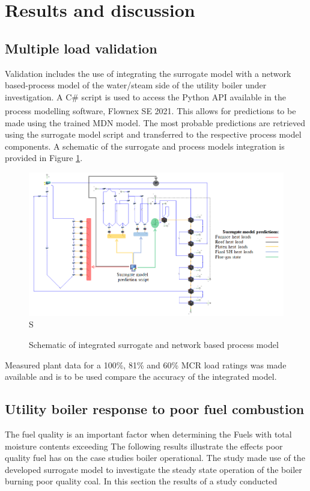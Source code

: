 \documentclass[a4paper,fleqn]{cas-sc}
\begin{document}
\section{Results and discussion}
\subsection{Multiple load validation}

Validation includes the use of integrating the surrogate model with a network based-process model of the water/steam side of the utility boiler under investigation. A C\# script is used to access the Python API available in the process modelling software, Flownex SE\textsuperscript{\textregistered} 2021. This allows for predictions to be made using the trained MDN model. The most probable predictions are retrieved using the surrogate model script and transferred to the respective process model components. A schematic of the surrogate and process models integration is provided in Figure \ref{fig_int_model}.

\begin{figure}[h!]
	\centering
		\includegraphics[scale=0.65]{INTEGRATED_MODEL}S
	  \caption{Schematic of integrated surrogate and network based process model}\label{fig_int_model}
\end{figure}

Measured plant data for a 100\%, 81\% and 60\% MCR load ratings was made available and is to be used compare the accuracy of the integrated model.
\subsection{Utility boiler response to poor fuel combustion}
The fuel quality is an important factor when determining the 
Fuels with total moisture contents exceeding 
The following results illustrate the effects poor quality fuel has on the case studies boiler operational. The study made use of the developed surrogate model to investigate the steady state operation of the boiler burning poor quality coal.  
In this section the results of a study conducted  
\end{document}
